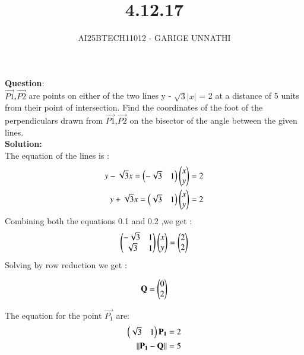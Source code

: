 \documentclass[journal]{IEEEtran}
\begin{document}



\title{4.12.17}
\author{AI25BTECH11012 - GARIGE UNNATHI}
{\let\newpage\relax\maketitle}


\renewcommand{\thefigure}{\theenumi}
\renewcommand{\thetable}{\theenumi}
\setlength{\intextsep}{10pt} %



\vspace{-1cm}

\textbf{Question}:\\
$\vec{P1}$,$\vec{P2}$ are points on either of the two lines y - $\sqrt{3}$$\lvert x \rvert$ = 2 at a distance of 5 units from their point of intersection. Find the coordinates of the foot of the perpendiculars drawn from $\vec{P1}$,$\vec{P2}$ on the bisector of the angle between the given lines.\\

\textbf{Solution:}\\

The equation of the lines is :
\begin{align}
  y - \sqrt{3}x = \begin{pmatrix}-\sqrt{3} & 1\end{pmatrix}\begin{pmatrix}x\\y\end{pmatrix} = 2\\
   y + \sqrt{3}x = \begin{pmatrix}\sqrt{3} & 1\end{pmatrix}\begin{pmatrix}x\\y\end{pmatrix} = 2 
\end{align}
Combining both the equations 0.1 and 0.2 ,we get :
\begin{align}
   \begin{pmatrix}-\sqrt{3} & 1\\
           \sqrt{3} & 1 \end{pmatrix}\begin{pmatrix}x\\y\end{pmatrix} = \begin{pmatrix}2\\2\end{pmatrix}
\end{align}
Solving by row reduction we get :

\begin{align}
\mathbf{Q} = \begin{pmatrix}0\\2\end{pmatrix}
\end{align}

The equation for the point $\vec{P_1}$ are:
\begin{align}
\begin{pmatrix}\sqrt{3} & 1\end{pmatrix}\mathbf{P_1} = 2\\
\lVert \mathbf{P_1} -  \mathbf{Q} \rVert = 5
\end{align}
\end{document}
